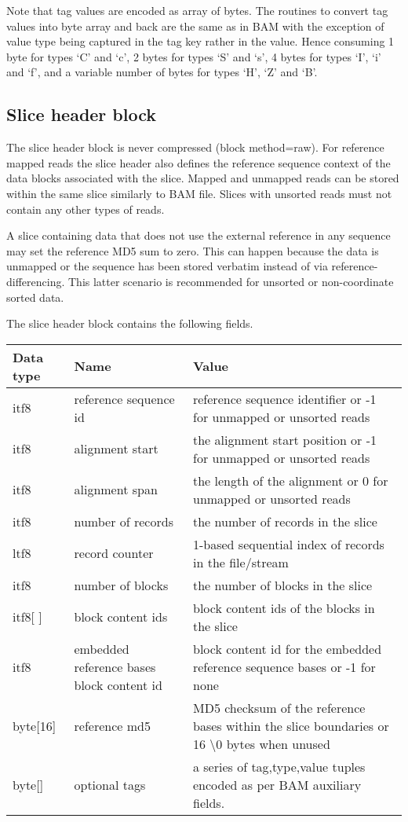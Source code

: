 \documentclass[a4paper]{article}
\begin{document}
Note that tag values are encoded as array of bytes. The routines to convert tag 
values into byte array and back are the same as in BAM with the exception of value 
type being captured in the tag key rather in the value.
Hence consuming 1 byte for types `C' and `c', 2 bytes for types `S' and `s', 4 bytes for types `I', `i' and `f', and a variable number of bytes for types `H', `Z' and `B'.

\subsection{\textbf{Slice header block}}

The slice header block is never compressed (block method=raw). For reference mapped 
reads the slice header also defines the reference sequence context of the data 
blocks associated with the slice. Mapped and unmapped reads can be stored within 
the same slice similarly to BAM file. Slices with unsorted reads must not contain 
any other types of reads.

A slice containing data that does not use the external reference in
any sequence may set the reference MD5 sum to zero.  This can happen
because the data is unmapped or the sequence has been stored verbatim
instead of via reference-differencing.  This latter scenario is
recommended for unsorted or non-coordinate sorted data.

The slice header block contains the following fields.

\begin{tabular}{|l|l|>{\raggedright}p{200pt}|}
\hline
\textbf{Data type} & \textbf{Name} & \textbf{Value}\tabularnewline
\hline
itf8 & reference sequence id & reference sequence identifier or -1 for unmapped 
or unsorted reads\tabularnewline
\hline
itf8 & alignment start & the alignment start position or -1 for unmapped or unsorted 
reads\tabularnewline
\hline
itf8 & alignment span & the length of the alignment or 0 for unmapped or unsorted 
reads\tabularnewline
\hline
itf8 & number of records & the number of records in the slice\tabularnewline
\hline
ltf8 & record counter & 1-based sequential index of records in the file/stream\tabularnewline
\hline
itf8 & number of blocks & the number of blocks in the slice\tabularnewline
\hline
itf8[ ] & block content ids & block content ids of the blocks in the slice\tabularnewline
\hline
itf8 & embedded reference bases block content id & block content id for the embedded 
reference sequence bases or -1 for none\tabularnewline
\hline
byte[16] & reference md5 & MD5 checksum of the reference bases within the slice 
boundaries or 16 \textbackslash{}0 bytes when unused\tabularnewline
\hline
byte[] & optional tags & a series of tag,type,value tuples encoded as
per BAM auxiliary fields.\tabularnewline
\hline
\end{tabular}
\end{document}
